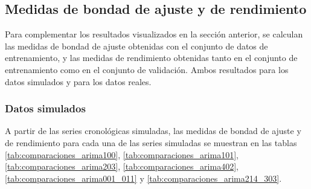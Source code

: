 \documentclass[
]{article}
\begin{document}
\subsection{Medidas de bondad de ajuste y de rendimiento}

Para complementar los resultados visualizados en la sección anterior, se
calculan las medidas de bondad de ajuste obtenidas con el conjunto de
datos de entrenamiento, y las medidas de rendimiento obtenidas tanto en
el conjunto de entrenamiento como en el conjunto de validación. Ambos
resultados para los datos simulados y para los datos reales.

\subsubsection{Datos simulados}

A partir de las series cronológicas simuladas, las medidas de bondad de
ajuste y de rendimiento para cada una de las series simuladas se
muestran en las tablas \ref{tab:comparaciones_arima100},
\ref{tab:comparaciones_arima101}, \ref{tab:comparaciones_arima203},
\ref{tab:comparaciones_arima402}, \ref{tab:comparaciones_arima001_011} y
\ref{tab:comparaciones_arima214_303}.
\end{document}
